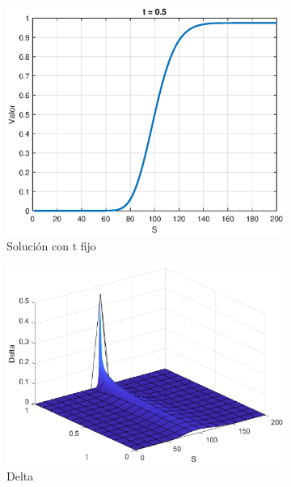\begin{figure}[H]
\begin{subfigure}[b]{0.35\linewidth}
    \end{subfigure}
    \begin{subfigure}[b]{0.35\linewidth}
        \includegraphics[width=\linewidth]{Imagenes/6_Sols/Binary_Call/BinaryCalltFIjo.eps}
        \caption{Solución con t fijo}
    \end{subfigure}
    \begin{subfigure}[b]{0.35\linewidth}
        \includegraphics[width=\linewidth]{Imagenes/6_Sols/Binary_Call/Binary_Call_Delta.eps}
        \caption{Delta}
    \end{subfigure}
    \begin{subfigure}[b]{0.35\linewidth}

\end{subfigure}
\end{figure}

